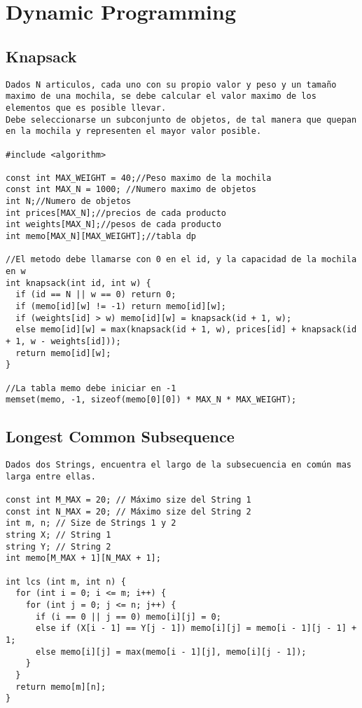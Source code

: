\documentclass[10pt,letterpaper,twocolumn,twosided]{article}
\begin{document}
\section{Dynamic Programming}

\subsection{Knapsack}
\begin{lstlisting}
Dados N articulos, cada uno con su propio valor y peso y un tamaño maximo de una mochila, se debe calcular el valor maximo de los elementos que es posible llevar.
Debe seleccionarse un subconjunto de objetos, de tal manera que quepan en la mochila y representen el mayor valor posible.

#include <algorithm>

const int MAX_WEIGHT = 40;//Peso maximo de la mochila
const int MAX_N = 1000; //Numero maximo de objetos
int N;//Numero de objetos 
int prices[MAX_N];//precios de cada producto
int weights[MAX_N];//pesos de cada producto
int memo[MAX_N][MAX_WEIGHT];//tabla dp

//El metodo debe llamarse con 0 en el id, y la capacidad de la mochila en w
int knapsack(int id, int w) {
  if (id == N || w == 0) return 0;
  if (memo[id][w] != -1) return memo[id][w];
  if (weights[id] > w) memo[id][w] = knapsack(id + 1, w);
  else memo[id][w] = max(knapsack(id + 1, w), prices[id] + knapsack(id + 1, w - weights[id]));
  return memo[id][w];
}

//La tabla memo debe iniciar en -1
memset(memo, -1, sizeof(memo[0][0]) * MAX_N * MAX_WEIGHT);
\end{lstlisting}

\subsection{Longest Common Subsequence}
\begin{lstlisting}
Dados dos Strings, encuentra el largo de la subsecuencia en común mas larga entre ellas.

const int M_MAX = 20; // Máximo size del String 1
const int N_MAX = 20; // Máximo size del String 2 
int m, n; // Size de Strings 1 y 2
string X; // String 1
string Y; // String 2
int memo[M_MAX + 1][N_MAX + 1];

int lcs (int m, int n) {
  for (int i = 0; i <= m; i++) {
    for (int j = 0; j <= n; j++) {
      if (i == 0 || j == 0) memo[i][j] = 0;
      else if (X[i - 1] == Y[j - 1]) memo[i][j] = memo[i - 1][j - 1] + 1;
      else memo[i][j] = max(memo[i - 1][j], memo[i][j - 1]);
    }
  }
  return memo[m][n];
}\end{lstlisting}
\end{document}
